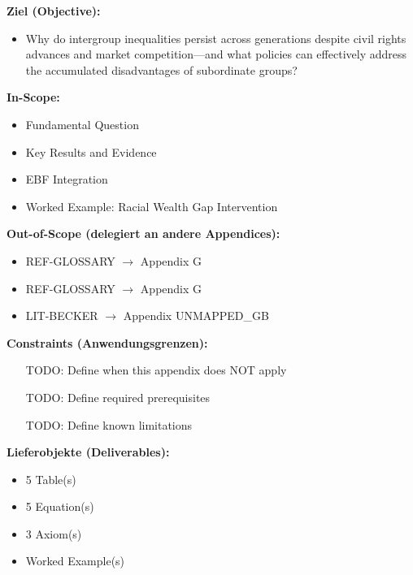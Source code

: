 \begin{tcolorbox}[
    colback=orange!5!white,
    colframe=orange!75!black,
    title={\textbf{Appendix Scope: Ziel / In-Scope / Out-of-Scope / Constraints}},
    fonttitle=\bfseries
]

\textbf{Ziel (Objective):}
\begin{itemize}[nosep]
    \item Why do intergroup inequalities persist across generations despite civil rights advances and market competition---and what policies can effectively address the accumulated disadvantages of subordinate groups?
\end{itemize}

\textbf{In-Scope:}
\begin{itemize}[nosep]
    \item Fundamental Question
    \item Key Results and Evidence
    \item EBF Integration
    \item Worked Example: Racial Wealth Gap Intervention
\end{itemize}

\textbf{Out-of-Scope (delegiert an andere Appendices):}
\begin{itemize}[nosep]
    \item REF-GLOSSARY $\rightarrow$ Appendix G
    \item REF-GLOSSARY $\rightarrow$ Appendix G
    \item LIT-BECKER $\rightarrow$ Appendix UNMAPPED_GB
\end{itemize}

\textbf{Constraints (Anwendungsgrenzen):}
\begin{itemize}[nosep]
    \item [TODO: Define when this appendix does NOT apply]
    \item [TODO: Define required prerequisites]
    \item [TODO: Define known limitations]
\end{itemize}

\textbf{Lieferobjekte (Deliverables):}
\begin{itemize}[nosep]
    \item 5 Table(s)
    \item 5 Equation(s)
    \item 3 Axiom(s)
    \item Worked Example(s)
\end{itemize}

\end{tcolorbox}



